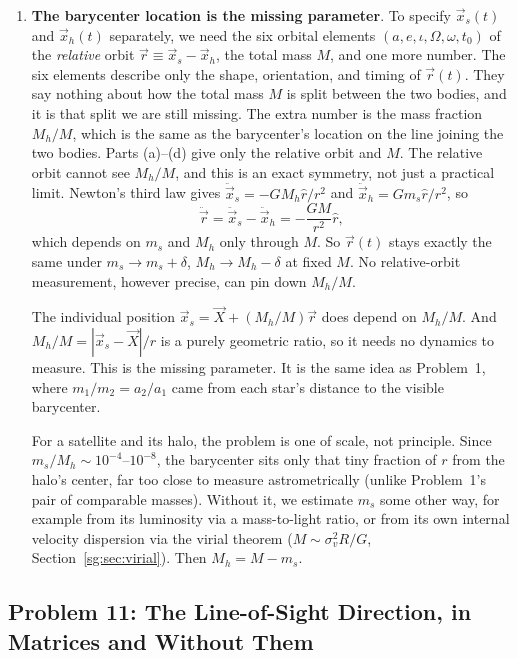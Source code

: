 \begin{enumerate}[label=(\alph*)]
	\item \textbf{The barycenter location is the missing parameter}. To specify $\vec x_s(t)$ and $\vec x_h(t)$ separately, we need the six orbital elements $(a,e,\iota,\Omega,\omega,t_0)$ of the \emph{relative} orbit $\vec r\equiv\vec x_s-\vec x_h$, the total mass $M$, and one more number. The six elements describe only the shape, orientation, and timing of $\vec r(t)$. They say nothing about how the total mass $M$ is split between the two bodies, and it is that split we are still missing. The extra number is the mass fraction $M_h/M$, which is the same as the barycenter's location on the line joining the two bodies. Parts (a)--(d) give only the relative orbit and $M$. The relative orbit cannot see $M_h/M$, and this is an exact symmetry, not just a practical limit. Newton's third law gives $\ddot{\vec x}_s=-GM_h\hat r/r^2$ and $\ddot{\vec x}_h=Gm_s\hat r/r^2$, so
	\[
	\ddot{\vec r}=\ddot{\vec x}_s-\ddot{\vec x}_h=-\frac{GM}{r^2}\hat r,
	\]
	which depends on $m_s$ and $M_h$ only through $M$. So $\vec r(t)$ stays exactly the same under $m_s\to m_s+\delta$, $M_h\to M_h-\delta$ at fixed $M$. No relative-orbit measurement, however precise, can pin down $M_h/M$.
	
	The individual position $\vec x_s=\vec X+(M_h/M)\vec r$ does depend on $M_h/M$. And $M_h/M=|\vec x_s-\vec X|/r$ is a purely geometric ratio, so it needs no dynamics to measure. This is the missing parameter. It is the same idea as Problem~1, where $m_1/m_2=a_2/a_1$ came from each star's distance to the visible barycenter.
	
	For a satellite and its halo, the problem is one of scale, not principle. Since $m_s/M_h\sim10^{-4}$--$10^{-8}$, the barycenter sits only that tiny fraction of $r$ from the halo's center, far too close to measure astrometrically (unlike Problem~1's pair of comparable masses). Without it, we estimate $m_s$ some other way, for example from its luminosity via a mass-to-light ratio, or from its own internal velocity dispersion via the virial theorem ($M \sim \sigma_v^2 R / G$, Section~\ref{sg:sec:virial}). Then $M_h=M-m_s$.
\end{enumerate}

\subsection{Problem 11: The Line-of-Sight Direction, in Matrices and Without Them}
\label{tb:prob:los}

